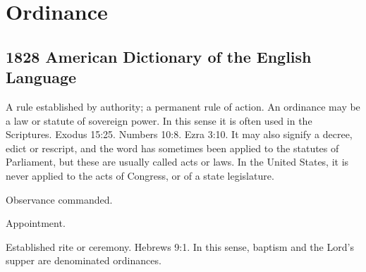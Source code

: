 \section{Ordinance}
	\label{ORDINANCE}
	

\subsection{1828 American Dictionary of the English Language} %
	\label{ORDINANCE-1828}

	\begin{compactitem}
		\item[1] A rule established by authority; a permanent rule of action. An ordinance may be a law or statute of sovereign power. In this sense it is often used in the Scriptures. Exodus 15:25. Numbers 10:8. Ezra 3:10. It may also signify a decree, edict or rescript, and the word has sometimes been applied to the statutes of Parliament, but these are usually called acts or laws. In the United States, it is never applied to the acts of Congress, or of a state legislature.
		\item[2] Observance commanded.
		\item[3] Appointment.
		\item[4] Established rite or ceremony. Hebrews 9:1. In this sense, baptism and the Lord's supper are denominated ordinances.
	\end{compactitem}




